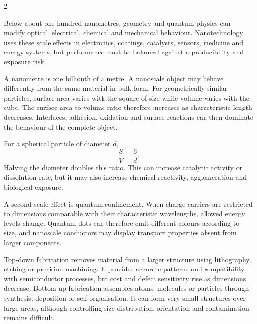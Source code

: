 

\begin{multicols}{2}
\begin{engineeringnews}
Below about one hundred nanometres, geometry and quantum physics can modify optical, electrical, chemical and
mechanical behaviour. Nanotechnology uses these scale effects in electronics, coatings, catalysts, sensors,
medicine and energy systems, but performance must be balanced against reproducibility and exposure risk.
\end{engineeringnews}

\begin{ecarticle}
A nanometre is one billionth of a metre. A nanoscale object may behave differently from the same material in bulk
form. For geometrically similar particles, surface area varies with the square of size while volume varies with
the cube. The surface-area-to-volume ratio therefore increases as characteristic length decreases. Interfaces,
adhesion, oxidation and surface reactions can then dominate the behaviour of the complete object.

For a spherical particle of diameter $d$,
\[
\frac{S}{V}=\frac{6}{d}.
\]
Halving the diameter doubles this ratio. This can increase catalytic activity or dissolution rate, but it may also
increase chemical reactivity, agglomeration and biological exposure.

A second scale effect is quantum confinement. When charge carriers are restricted to dimensions comparable with
their characteristic wavelengths, allowed energy levels change. Quantum dots can therefore emit different colours
according to size, and nanoscale conductors may display transport properties absent from larger components.

Top-down fabrication removes material from a larger structure using lithography, etching or precision machining.
It provides accurate patterns and compatibility with semiconductor processes, but cost and defect sensitivity rise
as dimensions decrease. Bottom-up fabrication assembles atoms, molecules or particles through synthesis,
deposition or self-organisation. It can form very small structures over large areas, although controlling size
distribution, orientation and contamination remains difficult.


\end{ecarticle}
\end{multicols}
